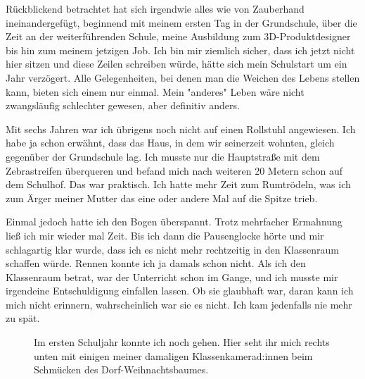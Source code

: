 \documentclass[fontsize=14pt,a4paper,headinclude,DIV=calc,automark]{scrbook}
\begin{document}
Rückblickend betrachtet hat sich irgendwie alles wie von Zauberhand ineinandergefügt, beginnend mit meinem ersten Tag in der Grundschule, über die Zeit an der weiterführenden Schule, meine Ausbildung zum 3D-\-Pro\-dukt\-de\-signer bis hin zum meinem jetzigen Job. Ich bin mir ziemlich sicher, dass ich jetzt nicht hier sitzen und diese Zeilen schreiben würde, hätte sich mein Schulstart um ein Jahr verzögert. Alle Gelegenheiten, bei denen man die Weichen des Lebens stellen kann, bieten sich einem nur einmal. Mein "anderes" Leben wäre nicht zwangsläufig schlechter gewesen, aber definitiv anders.

Mit sechs Jahren war ich übrigens noch nicht auf einen Rollstuhl angewiesen. Ich habe ja schon erwähnt, dass das Haus, in dem wir seinerzeit wohnten, gleich gegenüber der Grundschule lag. Ich musste nur die Hauptstraße mit dem Zebrastreifen überqueren und befand mich nach weiteren 20 Metern schon auf dem Schulhof. Das war praktisch. Ich hatte mehr Zeit zum Rumtrödeln, was ich zum Ärger meiner Mutter das eine oder andere Mal auf die Spitze trieb.

Einmal jedoch hatte ich den Bogen überspannt. Trotz mehrfacher Ermahnung ließ ich mir wieder mal Zeit. Bis ich dann die Pausenglocke hörte und mir schlagartig klar wurde, dass ich es nicht mehr rechtzeitig in den Klassenraum schaffen würde. Rennen konnte ich ja damals schon nicht. Als ich den Klassenraum betrat, war der Unterricht schon im Gange, und ich musste mir irgendeine Entschuldigung einfallen lassen. Ob sie glaubhaft war, daran kann ich mich nicht erinnern, wahrscheinlich war sie es nicht. Ich kam jedenfalls nie mehr zu spät.

\setlength{\fboxsep}{0pt}    %
\setlength{\fboxrule}{0.2pt} %
\begin{figure}[ht]
    \centering
    \caption{Im ersten Schuljahr konnte ich noch gehen. Hier seht ihr mich rechts unten mit einigen meiner damaligen Klassenkamerad:innen beim Schmücken des Dorf-Weihnachtsbaumes.}
    \label{fig:schule2}
\end{figure}
\end{document}
